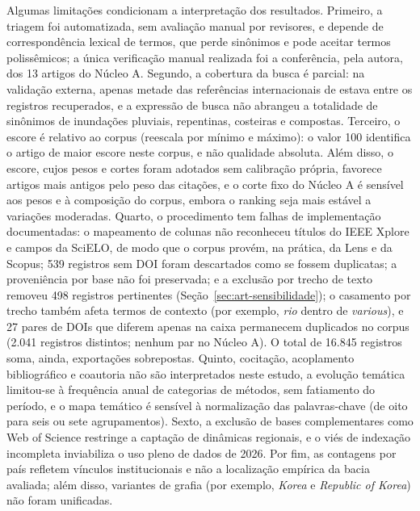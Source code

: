 Algumas limitações condicionam a interpretação dos resultados. Primeiro, a triagem foi automatizada, sem avaliação manual por revisores, e depende de correspondência lexical de termos, que perde sinônimos e pode aceitar termos polissêmicos; a única verificação manual realizada foi a conferência, pela autora, dos 13 artigos do Núcleo A. Segundo, a cobertura da busca é parcial: na validação externa, apenas metade das referências internacionais de  estava entre os registros recuperados, e a expressão de busca não abrangeu a totalidade de sinônimos de inundações pluviais, repentinas, costeiras e compostas. Terceiro, o escore é relativo ao corpus (reescala por mínimo e máximo): o valor 100 identifica o artigo de maior escore neste corpus, e não qualidade absoluta. Além disso, o escore, cujos pesos e cortes foram adotados sem calibração própria, favorece artigos mais antigos pelo peso das citações, e o corte fixo do Núcleo A é sensível aos pesos e à composição do corpus, embora o ranking seja mais estável a variações moderadas. Quarto, o procedimento tem falhas de implementação documentadas: o mapeamento de colunas não reconheceu títulos do IEEE Xplore e campos da SciELO, de modo que o corpus provém, na prática, da Lens e da Scopus; 539 registros sem DOI foram descartados como se fossem duplicatas; a proveniência por base não foi preservada; e a exclusão por trecho de texto removeu 498 registros pertinentes (Seção~\ref{sec:art-sensibilidade}); o casamento por trecho também afeta termos de contexto (por exemplo, \textit{rio} dentro de \textit{various}), e 27 pares de DOIs que diferem apenas na caixa permanecem duplicados no corpus (2.041 registros distintos; nenhum par no Núcleo A). O total de 16.845 registros soma, ainda, exportações sobrepostas. Quinto, cocitação, acoplamento bibliográfico e coautoria não são interpretados neste estudo, a evolução temática limitou-se à frequência anual de categorias de métodos, sem fatiamento do período, e o mapa temático é sensível à normalização das palavras-chave (de oito para seis ou sete agrupamentos). Sexto, a exclusão de bases complementares como Web of Science restringe a captação de dinâmicas regionais, e o viés de indexação incompleta inviabiliza o uso pleno de dados de 2026. Por fim, as contagens por país refletem vínculos institucionais e não a localização empírica da bacia avaliada; além disso, variantes de grafia (por exemplo, \textit{Korea} e \textit{Republic of Korea}) não foram unificadas.

